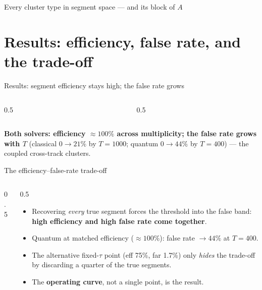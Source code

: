 \begin{frame}{Every cluster type in segment space --- and its block of $A$}
  \centering
\end{frame}

\section{Results: efficiency, false rate, and the trade-off}
\begin{frame}{Results: segment efficiency stays high; the false rate grows}
  \begin{columns}[T]
    \begin{column}{0.5\textwidth}
      \centering {} \\ 
    \end{column}
    \begin{column}{0.5\textwidth}
      \centering {} \\ 
    \end{column}
  \end{columns}
  \vspace{-2pt}
  {\footnotesize \textbf{Both solvers: efficiency $\approx100\%$ across multiplicity; the false rate grows with $T$} (classical $0\!\to\!21\%$ by $T{=}1000$; quantum $0\!\to\!44\%$ by $T{=}400$) --- the coupled cross-track clusters.}
\end{frame}

\begin{frame}{The efficiency--false-rate trade-off}
  \begin{columns}[T]
    \begin{column}{0.5\textwidth}
      \centering{}
    \end{column}
    \begin{column}{0.5\textwidth}
      \begin{itemize}
        \item Recovering \emph{every} true segment forces the threshold into the false band: \textbf{high efficiency and high false rate come together}.
        \item Quantum at matched efficiency ($\approx100\%$): false rate $\to 44\%$ at $T{=}400$.
        \item The alternative fixed-$\tau$ point (eff 75\%, far 1.7\%) only \emph{hides} the trade-off by discarding a quarter of the true segments.
        \item The \textbf{operating curve}, not a single point, is the result.
      \end{itemize}
    \end{column}
  \end{columns}
\end{frame}

